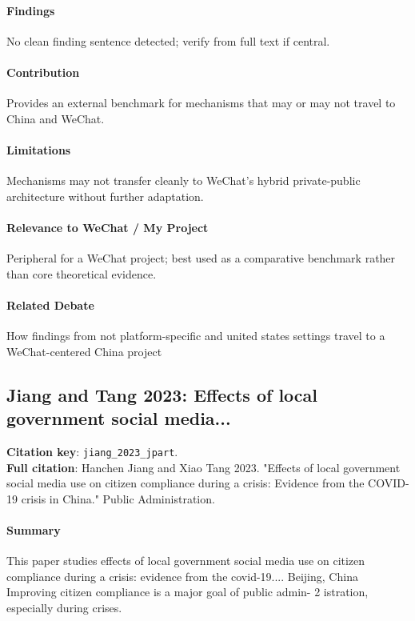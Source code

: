 \documentclass[12pt]{article}
\begin{document}
\paragraph{Findings} No clean finding sentence detected; verify from full text if central.

\paragraph{Contribution} Provides an external benchmark for mechanisms that may or may not travel to China and WeChat.

\paragraph{Limitations} Mechanisms may not transfer cleanly to WeChat's hybrid private-public architecture without further adaptation.

\paragraph{Relevance to WeChat / My Project} Peripheral for a WeChat project; best used as a comparative benchmark rather than core theoretical evidence.

\paragraph{Related Debate} How findings from not platform-specific and united states settings travel to a WeChat-centered China project


\subsection{Jiang and Tang 2023: Effects of local government social media...}
\textbf{Citation key}: \texttt{jiang\_2023\_jpart}.\\
\textbf{Full citation}: Hanchen Jiang and Xiao Tang 2023. "Effects of local government social media use on citizen compliance during a crisis: Evidence from the COVID-19 crisis in China." Public Administration.

\paragraph{Summary} This paper studies effects of local government social media use on citizen compliance during a crisis: evidence from the covid-19.... Beijing, China Improving citizen compliance is a major goal of public admin- 2 istration, especially during crises.
\end{document}
